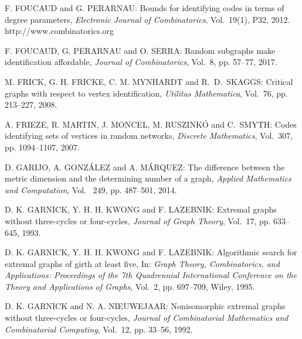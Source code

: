 \begin{thebibliography}{999}
F. FOUCAUD and G. PERARNAU: Bounds for identifying codes in terms of degree parameters, {\it Electronic Journal of Combinatorics}, Vol.~19(1), P32, 2012.\\
http://www.combinatorics.org

F. FOUCAUD, G. PERARNAU and O. SERRA: Random subgraphs make identification affordable, {\it Journal of  Combinatorics}, Vol.~8, pp. 57--77, 2017.

%
%
M. FRICK, G. H. FRICKE, C. M. MYNHARDT and R.~D.~SKAGGS: Critical graphs with respect to vertex identification, {\it Utilitas Mathematica}, Vol.~76, pp. 213--227, 2008.

A. FRIEZE, R. MARTIN, J. MONCEL, M. RUSZINK\'O and C.~SMYTH: Codes identifying sets of vertices in random networks, {\it Discrete Mathematics}, Vol.~307, pp. 1094--1107, 2007.

%
D. GARIJO, A. GONZ\'ALEZ and A. M\'ARQUEZ: The difference between the metric dimension and the determining number of a graph, {\it Applied Mathematics and Computation}, Vol.~ 249, pp. 487--501, 2014.
  
D. K. GARNICK, Y. H. H. KWONG and F. LAZEBNIK: Extremal graphs without three-cycles or four-cycles, {\it Journal of Graph Theory}, Vol.~17, pp. 633--645, 1993.

D. K. GARNICK, Y. H. H. KWONG and F. LAZEBNIK: Algorithmic search for extremal graphs of girth at least five, In: {\it Graph Theory, Combinatorics, and Applications: Proceedings of the 7th Quadrennial International Conference on the Theory and Applications of Graphs}, Vol.~2, pp. 697--709, Wiley, 1995.

D. K. GARNICK and N. A. NIEUWEJAAR: Nonisomorphic extremal graphs without three-cycles or four-cycles, {\it Journal of Combinatorial Mathematics and Combinatorial Computing}, Vol.~12, pp. 33--56, 1992.


\end{thebibliography}
